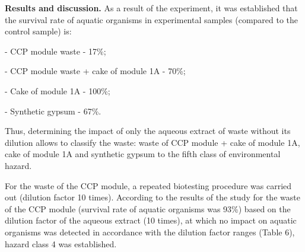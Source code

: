 
{\bfseries Results and discussion.} As a result of the experiment, it was
established that the survival rate of aquatic organisms in experimental
samples (compared to the control sample) is:

- CCP module waste - 17\%;

- CCP module waste + cake of module 1A - 70\%;

- Cake of module 1A - 100\%;

- Synthetic gypsum - 67\%.

Thus, determining the impact of only the aqueous extract of waste
without its dilution allows to classify the waste: waste of CCP module +
cake of module 1A, cake of module 1A and synthetic gypsum to the fifth
class of environmental hazard.

For the waste of the CCP module, a repeated biotesting procedure was
carried out (dilution factor 10 times). According to the results of the
study for the waste of the CCP module (survival rate of aquatic
organisms was 93\%) based on the dilution factor of the aqueous extract
(10 times), at which no impact on aquatic organisms was detected in
accordance with the dilution factor ranges (Table 6), hazard class 4 was
established.

